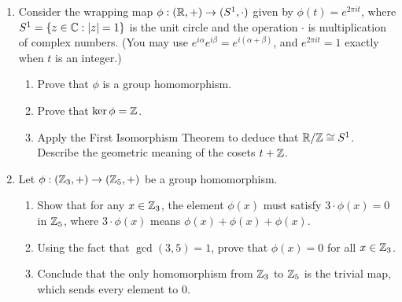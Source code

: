 \begin{enumerate}
  \item Consider the wrapping map $\phi: (\mathbb{R}, +) \to (S^1, \cdot)$ given by $\phi(t) = e^{2\pi i t}$, where $S^1 = \{z \in \mathbb{C} : |z| = 1\}$ is the unit circle and the operation $\cdot$ is multiplication of complex numbers. (You may use $e^{i\alpha} e^{i\beta} = e^{i(\alpha + \beta)}$, and $e^{2\pi i t} = 1$ exactly when $t$ is an integer.)
  \begin{enumerate}
    \item Prove that $\phi$ is a group homomorphism.
    \item Prove that $\ker\phi = \mathbb{Z}$.
    \item Apply the First Isomorphism Theorem to deduce that $\mathbb{R}/\mathbb{Z} \cong S^1$. Describe the geometric meaning of the cosets $t + \mathbb{Z}$.
  \end{enumerate}
  \item Let $\phi: (\mathbb{Z}_3, +) \to (\mathbb{Z}_5, +)$ be a group homomorphism.
  \begin{enumerate}
    \item Show that for any $x \in \mathbb{Z}_3$, the element $\phi(x)$ must satisfy $3 \cdot \phi(x) = 0$ in $\mathbb{Z}_5$, where $3 \cdot \phi(x)$ means $\phi(x) + \phi(x) + \phi(x)$.
    \item Using the fact that $\gcd(3, 5) = 1$, prove that $\phi(x) = 0$ for all $x \in \mathbb{Z}_3$.
    \item Conclude that the only homomorphism from $\mathbb{Z}_3$ to $\mathbb{Z}_5$ is the trivial map, which sends every element to $0$.
  \end{enumerate}
\end{enumerate}

\newpage
